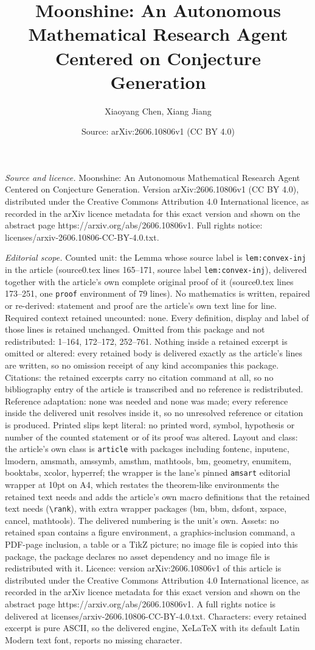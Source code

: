 \documentclass[10pt,a4paper]{amsart}
\title[Moonshine: An Autonomous Mathematical Research Agent Centere]{Moonshine: An Autonomous Mathematical Research Agent Centered on Conjecture Generation}
\author{Xiaoyang Chen, Xiang Jiang}
\date{Source: arXiv:2606.10806v1 (CC BY 4.0)}
\begin{document}
\maketitle

\noindent\emph{Source and licence.} Moonshine: An Autonomous Mathematical Research Agent Centered on Conjecture Generation. Version arXiv:2606.10806v1 (CC BY 4.0), distributed under the Creative Commons Attribution 4.0 International licence, as recorded in the arXiv licence metadata for this exact version and shown on the abstract page https://arxiv.org/abs/2606.10806v1. Full rights notice: licenses/arxiv-2606.10806-CC-BY-4.0.txt.\par\smallskip

\noindent\textit{Editorial scope.} Counted unit: the Lemma whose source label is \texttt{lem:convex-inj} in the article (source0.tex lines 165--171, source label \texttt{lem:convex-inj}), delivered together with the article's own complete original proof of it (source0.tex lines 173--251, one \texttt{proof} environment of 79 lines). No mathematics is written, repaired or re-derived: statement and proof are the article's own text line for line. Required context retained uncounted: none. Every definition, display and label of those lines is retained unchanged. Omitted from this package and not redistributed: 1--164, 172--172, 252--761. Nothing inside a retained excerpt is omitted or altered: every retained body is delivered exactly as the article's lines are written, so no omission receipt of any kind accompanies this package. Citations: the retained excerpts carry no citation command at all, so no bibliography entry of the article is transcribed and no reference is redistributed. Reference adaptation: none was needed and none was made; every reference inside the delivered unit resolves inside it, so no unresolved reference or citation is produced. Printed slips kept literal: no printed word, symbol, hypothesis or number of the counted statement or of its proof was altered. Layout and class: the article's own class is \texttt{article} with packages including fontenc, inputenc, lmodern, amsmath, amssymb, amsthm, mathtools, bm, geometry, enumitem, booktabs, xcolor, hyperref; the wrapper is the lane's pinned \texttt{amsart} editorial wrapper at 10pt on A4, which restates the theorem-like environments the retained text needs and adds the article's own macro definitions that the retained text needs (\texttt{\textbackslash rank}), with extra wrapper packages (bm, bbm, dsfont, xspace, cancel, mathtools). The delivered numbering is the unit's own. Assets: no retained span contains a figure environment, a graphics-inclusion command, a PDF-page inclusion, a table or a TikZ picture; no image file is copied into this package, the package declares no asset dependency and no image file is redistributed with it. Licence: version arXiv:2606.10806v1 of this article is distributed under the Creative Commons Attribution 4.0 International licence, as recorded in the arXiv licence metadata for this exact version and shown on the abstract page https://arxiv.org/abs/2606.10806v1. A full rights notice is delivered at licenses/arxiv-2606.10806-CC-BY-4.0.txt. Characters: every retained excerpt is pure ASCII, so the delivered engine, XeLaTeX with its default Latin Modern text font, reports no missing character.
\end{document}
